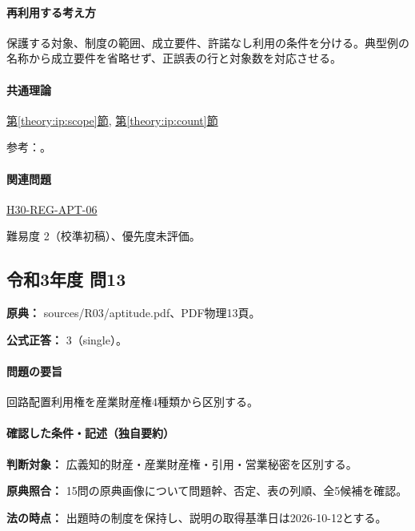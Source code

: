 \paragraph{再利用する考え方} 保護する対象、制度の範囲、成立要件、許諾なし利用の条件を分ける。典型例の名称から成立要件を省略せず、正誤表の行と対象数を対応させる。

\paragraph{共通理論} \hyperref[theory:ip:scope]{第\ref*{theory:ip:scope}節}, \hyperref[theory:ip:count]{第\ref*{theory:ip:count}節}

\par 参考：\cite{ip_industrial_four,ip_broad_scope}。

\paragraph{関連問題} \hyperref[q:h30-reg-apt-06]{H30-REG-APT-06}

\par 難易度 2（校準初稿）、優先度未評価。

\subsection{令和3年度 問13}
\label{q:r03-reg-apt-13}

\noindent\textbf{原典：} sources/R03/aptitude.pdf、PDF物理13頁。

\textbf{公式正答：} 3（single）。

\paragraph{問題の要旨} 回路配置利用権を産業財産権4種類から区別する。

\paragraph{確認した条件・記述（独自要約）}\mbox{}\par

\noindent\textbf{判断対象：} 広義知的財産・産業財産権・引用・営業秘密を区別する。\par

\noindent\textbf{原典照合：} 15問の原典画像について問題幹、否定、表の列順、全5候補を確認。\par

\noindent\textbf{法の時点：} 出題時の制度を保持し、説明の取得基準日は2026-10-12とする。\par

